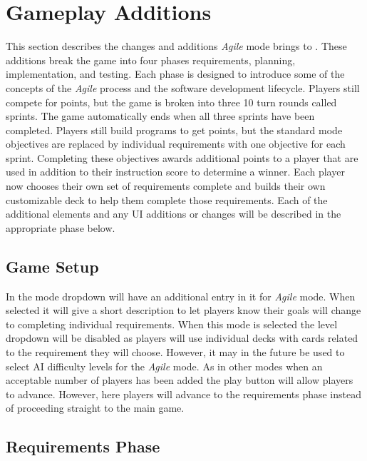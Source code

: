 \section{\pwThree Gameplay Additions}

This section describes the changes and additions \emph{Agile} mode brings to \pwThree.
These additions break the game into four phases requirements, planning, implementation,
and testing. Each phase is designed to introduce some of the concepts of the \emph{Agile} 
process and the software development lifecycle. Players still compete for points, but
the game is broken into three 10 turn rounds called sprints. The game automatically ends
when all three sprints have been completed. Players still build programs to get points,
but the standard mode objectives are replaced by individual requirements with
one objective for each sprint. Completing these objectives awards additional points to
a player that are used in addition to their instruction score to determine a winner.
Each player now chooses their own set of requirements complete and builds their own
customizable deck to help them complete those requirements. Each of the additional
elements and any UI additions or changes will be described in the appropriate
phase below.

\subsection{Game Setup}
In \pwThree the mode dropdown will have an additional entry in it for \emph{Agile} mode.
When selected it will give a short description to let players know their goals will
change to completing individual requirements. When this mode is selected the level
dropdown will be disabled as players will use individual decks with cards related to
the requirement they will choose. However, it may in the future be used to select AI
difficulty levels for the \emph{Agile} mode. As in other modes when an acceptable number
of players has been added the play button will allow players to advance. However,
here players will advance to the requirements phase instead of proceeding straight to
the main game.

\subsection{Requirements Phase}

